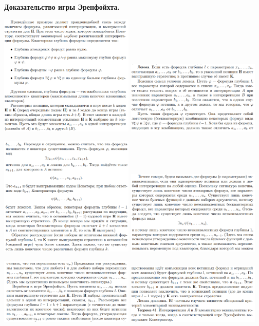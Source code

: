 \textbf{Доказательство игры Эренфойхта.}
\begin{center}
    \includegraphics[width=0.48\textwidth]{images/1.14_страница1.PNG}
    \includegraphics[width=0.48\textwidth]{images/1.14_страница2.PNG}

    \includegraphics[width=0.48\textwidth]{images/1.14_страница3.PNG}
    \includegraphics[width=0.48\textwidth]{images/1.14_страница4.PNG}

    \includegraphics[width=0.48\textwidth]{images/1.14_страница5.PNG}
    \includegraphics[width=0.48\textwidth]{images/1.14_страница6.PNG}
\end{center}

